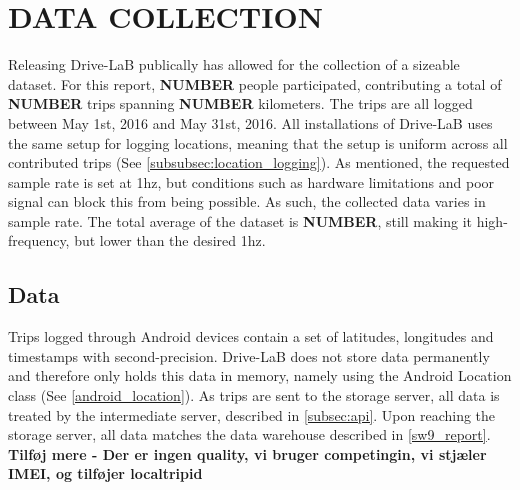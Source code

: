 \section{DATA COLLECTION}\label{sec:datacollection}
Releasing Drive-LaB publically has allowed for the collection of a sizeable dataset. For this report, \textbf{NUMBER} people participated, contributing a total of \textbf{NUMBER} trips spanning \textbf{NUMBER} kilometers. The trips are all logged between May 1st, 2016 and May 31st, 2016. All installations of Drive-LaB uses the same setup for logging locations, meaning that the setup is uniform across all contributed trips (See \ref{subsubsec:location_logging}). As mentioned, the requested sample rate is set at 1hz, but conditions such as hardware limitations and poor signal can block this from being possible. As such, the collected data varies in sample rate. The total average of the dataset is \textbf{NUMBER}, still making it high-frequency, but lower than the desired 1hz.

\subsection{Data}\label{subsec:data}
Trips logged through Android devices contain a set of latitudes, longitudes and timestamps with second-precision. Drive-LaB does not store data permanently and therefore only holds this data in memory, namely using the Android Location class (See \ref{android_location}). As trips are sent to the storage server, all data is treated by the intermediate server, described in \ref{subsec:api}. Upon reaching the storage server, all data matches the data warehouse described in \ref{sw9_report}. \textbf{Tilføj mere - Der er ingen quality, vi bruger competingin, vi stjæler IMEI, og tilføjer localtripid} 